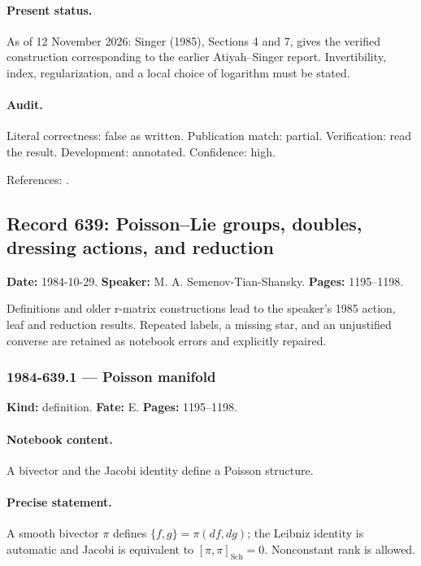 \paragraph{Present status.} As of 12 November 2026: Singer (1985), Sections 4 and 7, gives the verified construction corresponding to the earlier Atiyah--Singer report. Invertibility, index, regularization, and a local choice of logarithm must be stated.

\paragraph{Audit.} Literal correctness: false as written. Publication match: partial. Verification: read the result. Development: annotated. Confidence: high.

\noindent References: \citep{atiyahsinger1984dirac,singer1985families}.\par

\subsection{Record 639: Poisson--Lie groups, doubles, dressing actions, and reduction}

\label{talk:639}

\noindent\textbf{Date:} 1984-10-29. \textbf{Speaker:} M. A. Semenov-Tian-Shansky. \textbf{Pages:} 1195--1198.\par

Definitions and older r-matrix constructions lead to the speaker's 1985 action, leaf and reduction results. Repeated labels, a missing star, and an unjustified converse are retained as notebook errors and explicitly repaired.

\subsubsection{1984-639.1 --- Poisson manifold}

\label{item:1984-639.1}

\noindent\textbf{Kind:} definition. \textbf{Fate:} E. \textbf{Pages:} 1195--1198.\par

\paragraph{Notebook content.} A bivector and the Jacobi identity define a Poisson structure.

\paragraph{Precise statement.} A smooth bivector \(\pi\) defines \(\{f,g\}=\pi(df,dg)\); the Leibniz identity is automatic and Jacobi is equivalent to \([\pi,\pi]_{\mathrm{Sch}}=0\). Nonconstant rank is allowed.

